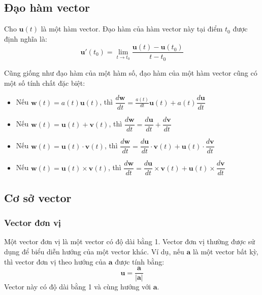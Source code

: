 \subsection{Đạo hàm vector}
\begin{definition}
    Cho \(\mathbf{u}(t)\) là một hàm vector. Đạo hàm của hàm vector này tại điểm \(t_0\) được định nghĩa là:
    \begin{equation}
        \mathbf{u}'(t_0) = \lim_{t \to t_0} \frac{\mathbf{u}(t) - \mathbf{u}(t_0)}{t - t_0}
    \end{equation}
\end{definition}
Cũng giống như đạo hàm của một hàm số, đạo hàm của một hàm vector cũng có một số tính chất đặc biệt:
\begin{itemize}
\item Nếu \(\mathbf{w}(t)=a(t)\mathbf{u}(t)\), thì \(\dfrac{d\mathbf{w}}{dt} = \frac{a(t)}{dt}\mathbf{u}(t) + a(t)\dfrac{d\mathbf{u}}{dt}\)
\item Nếu \(\mathbf{w}(t)=\mathbf{u}(t) + \mathbf{v}(t)\), thì \(\dfrac{d\mathbf{w}}{dt} = \dfrac{d\mathbf{u}}{dt} + \dfrac{d\mathbf{v}}{dt}\)
\item Nếu \(\mathbf{w}(t)=\mathbf{u}(t) \cdot \mathbf{v}(t)\), thì \(\dfrac{d\mathbf{w}}{dt} = \dfrac{d\mathbf{u}}{dt} \cdot \mathbf{v}(t) + \mathbf{u}(t) \cdot \dfrac{d\mathbf{v}}{dt}\)
\item Nếu \(\mathbf{w}(t)=\mathbf{u}(t) \times \mathbf{v}(t)\), thì \(\dfrac{d\mathbf{w}}{dt} = \dfrac{d\mathbf{u}}{dt} \times \mathbf{v}(t) + \mathbf{u}(t) \times \dfrac{d\mathbf{v}}{dt}\)
\end{itemize}

\subsection{Cơ sở vector}
\subsubsection{Vector đơn vị}
Một vector đơn vị là một vector có độ dài bằng 1. Vector đơn vị thường được sử dụng để biểu diễn hướng của một vector khác. Ví dụ, nếu \(\mathbf{a}\) là một vector bất kỳ, thì vector đơn vị theo hướng của \(\mathbf{a}\) được tính bằng:
\begin{equation}
    \mathbf{u} = \frac{\mathbf{a}}{|\mathbf{a}|} 
\end{equation}
Vector này có độ dài bằng 1 và cùng hướng với \(\mathbf{a}\).
